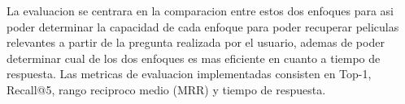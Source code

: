 La evaluacion se centrara en la comparacion entre estos dos enfoques para asi poder determinar la capacidad de cada enfoque para poder recuperar peliculas relevantes a partir de la pregunta realizada por el usuario, ademas de poder determinar cual de los dos enfoques es mas eficiente en cuanto a tiempo de respuesta. Las metricas de evaluacion implementadas consisten en Top-1, Recall@5, rango reci­proco medio (MRR) y tiempo de respuesta.



